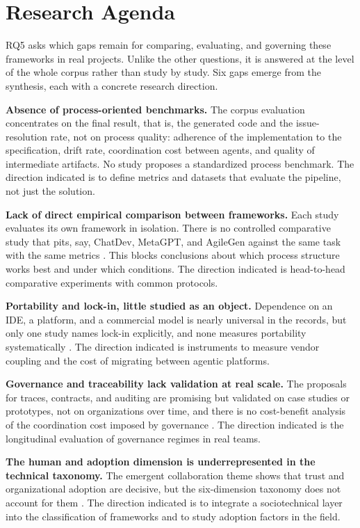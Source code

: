 \section{Research Agenda}

RQ5 asks which gaps remain for comparing, evaluating, and governing these frameworks in real projects. Unlike the other questions, it is answered at the level of the whole corpus rather than study by study. Six gaps emerge from the synthesis, each with a concrete research direction.

\noindent\textbf{Absence of process-oriented benchmarks.} The corpus evaluation concentrates on the final result, that is, the generated code and the issue-resolution rate, not on process quality: adherence of the implementation to the specification, drift rate, coordination cost between agents, and quality of intermediate artifacts. No study proposes a standardized process benchmark. The direction indicated is to define metrics and datasets that evaluate the pipeline, not just the solution.

\noindent\textbf{Lack of direct empirical comparison between frameworks.} Each study evaluates its own framework in isolation. There is no controlled comparative study that pits, say, ChatDev, MetaGPT, and AgileGen against the same task with the same metrics \cite{ChenQian2023,SiruiHong2023,SaiZhang2025}. This blocks conclusions about which process structure works best and under which conditions. The direction indicated is head-to-head comparative experiments with common protocols.

\noindent\textbf{Portability and lock-in, little studied as an object.} Dependence on an IDE, a platform, and a commercial model is nearly universal in the records, but only one study names lock-in explicitly, and none measures portability systematically \cite{SeyedmoeinMohsenimofidi2025}. The direction indicated is instruments to measure vendor coupling and the cost of migrating between agentic platforms.

\noindent\textbf{Governance and traceability lack validation at real scale.} The proposals for traces, contracts, and auditing are promising but validated on case studies or prototypes, not on organizations over time, and there is no cost-benefit analysis of the coordination cost imposed by governance \cite{Paduraru2026,Merchant2025,Watfa2026,Macedo2026}. The direction indicated is the longitudinal evaluation of governance regimes in real teams.

\noindent\textbf{The human and adoption dimension is underrepresented in the technical taxonomy.} The emergent collaboration theme shows that trust and organizational adoption are decisive, but the six-dimension taxonomy does not account for them \cite{DanielRusso2024,Ulfsnes2024,Baron2025,Akbar2025}. The direction indicated is to integrate a sociotechnical layer into the classification of frameworks and to study adoption factors in the field.

